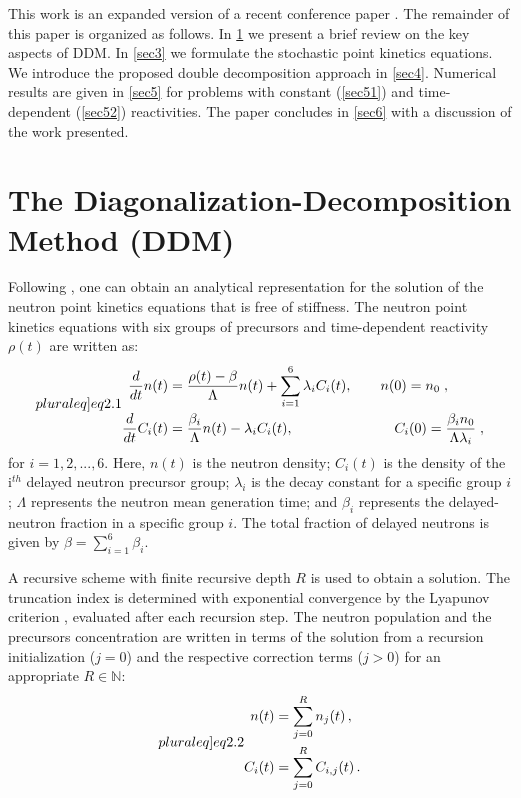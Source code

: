 \documentclass[preprint,12pt,authoryear]{elsarticle}
\begin{document}
This work is an expanded version of a recent conference paper \citep{wollmann_15b}.
The remainder of this paper is organized as follows.
In \cref{sec2} we present a brief review on the key aspects of DDM.
In \cref{sec3} we formulate the stochastic point kinetics equations.
We introduce the proposed double decomposition approach in \cref{sec4}.
Numerical results are given in \cref{sec5} for problems with constant (\cref{sec51}) and time-dependent (\cref{sec52}) reactivities.
The paper concludes in \cref{sec6} with a discussion of the work presented.

\section{The Diagonalization-Decomposition Method (DDM)}
\label{sec2}
\setcounter{section}{2}
\setcounter{equation}{0}

Following \citet{wollmann_14}, one can obtain an analytical representation for the solution of the neutron point kinetics equations that is free of stiffness.
The neutron point kinetics equations with six groups of precursors and time-dependent reactivity $\rho(t)$ are written as:
\begin{subequations}\label[pluraleq]{eq2.1}
\begin{align}
\frac{d}{dt}n(t)&=\frac{\rho(t)-\beta}{\Lambda} n(t)
+\sum_{i=1}^{6}\lambda_{i}C_{i}(t),  \qquad n(0)=n_{0} \;, 
\\
\frac{d}{dt}C_{i}(t)&=\frac{\beta_{i}}{\Lambda} n(t)-\lambda_{i}C_{i}(t),\hspace{72pt}
C_{i}(0)=\frac{\beta_{i}n_{0}}{\Lambda\lambda_{i}}\;,
\end{align}
\end{subequations}
for $i=1,2,...,6$.
Here, $n(t)$ is the neutron density; $C_{i}(t)$ is the density of the i$^{th}$ delayed neutron precursor group; $\lambda_i$ is the decay constant for a specific group $i$; $\Lambda$ represents the neutron mean generation time; and $\beta_i$ represents the delayed-neutron fraction in a specific group $i$.
The total fraction of delayed neutrons is given by $\beta = \sum\limits_{i=1}^6\beta_i$.

A recursive scheme with finite recursive depth $R$ is used to obtain a solution. The truncation index is determined with exponential convergence by the Lyapunov criterion \citep{boichenko_05, petersen_11a}, evaluated after each recursion step.
The neutron population and the precursors concentration are written in terms of the solution from a recursion initialization ($j=0$) and the respective correction terms ($j>0$) for an appropriate $R \in \mathbb{N}$: 
\begin{subequations}\label[pluraleq]{eq2.2}
\begin{align}
n(t)&=\sum_{j=0}^{R}n_{j}(t)\,,\\
C_{i}(t)&=\sum_{j=0}^{R}C_{i,j}(t)\, .
\end{align}
\end{subequations}
\end{document}
